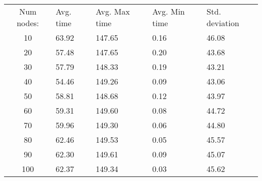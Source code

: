 \begin{tabular}{cllll}
Num nodes: & Avg. time & Avg. Max time & Avg. Min time & Std. deviation \\
10       & 63.92        & 147.65            & 0.16 & 46.08 \\
20       & 57.48        & 147.65            & 0.20 & 43.68 \\
30       & 57.79        & 148.33            & 0.19 & 43.21 \\
40       & 54.46        & 149.26            & 0.09 & 43.06 \\
50       & 58.81        & 148.68            & 0.12 & 43.97 \\
60       & 59.31        & 149.60            & 0.08 & 44.72 \\
70       & 59.96        & 149.30            & 0.06 & 44.80 \\
80       & 62.46        & 149.53            & 0.05 & 45.57 \\
90       & 62.30        & 149.61            & 0.09 & 45.07 \\
100       & 62.37        & 149.34            & 0.03 & 45.62 \\
\end{tabular}